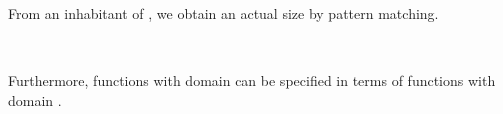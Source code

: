 From an inhabitant of , we obtain an actual size by
pattern matching.
\begin{code}%
\>[0]\AgdaSpace{}%
\AgdaSymbol{:}\AgdaSpace{}%
\AgdaSpace{}%
\AgdaSymbol{\{}\AgdaSymbol{\}}\AgdaSpace{}%
\AgdaSpace{}%
\AgdaSpace{}%
\AgdaSpace{}%
\AgdaSpace{}%
\<%
\\
\>[0]\AgdaSpace{}%
\AgdaOperator{\AgdaInductiveConstructor{[}}\AgdaSpace{}%
\AgdaSpace{}%
\AgdaOperator{\AgdaInductiveConstructor{]}}\AgdaSpace{}%
\AgdaSymbol{=}\AgdaSpace{}%
\<%
\end{code}
Furthermore, functions with domain   can be specified in terms of functions with domain  .
\begin{code}%
\>[0]\AgdaSpace{}%
\AgdaSymbol{:}\AgdaSpace{}%
\AgdaSymbol{\{}\AgdaSpace{}%
\AgdaSymbol{:}\AgdaSpace{}%
\AgdaSpace{}%
\AgdaSpace{}%
\AgdaSymbol{\}}\AgdaSpace{}%
\AgdaSymbol{\{}\AgdaSpace{}%
\AgdaSymbol{:}\AgdaSpace{}%
\AgdaSymbol{\}}\AgdaSpace{}%
\AgdaSpace{}%
\AgdaSymbol{((}\AgdaSpace{}%
\AgdaSymbol{:}\AgdaSpace{}%
\AgdaSpace{}%
\AgdaSymbol{)}\AgdaSpace{}%
\AgdaSpace{}%
\AgdaSpace{}%
\AgdaSymbol{)}\<%
\\
\>[0][@{}l@{\AgdaIndent{0}}]%
\>[2]\AgdaSpace{}%
\AgdaSymbol{(}\AgdaSpace{}%
\AgdaSymbol{:}\AgdaSpace{}%
\AgdaSpace{}%
\AgdaSymbol{)}\AgdaSpace{}%
\AgdaSpace{}%
\AgdaSpace{}%
\AgdaSymbol{(}\AgdaSpace{}%
\AgdaSymbol{)}\<%
\\
\>[0]\AgdaSpace{}%
\AgdaSpace{}%
\AgdaOperator{\AgdaInductiveConstructor{[}}\AgdaSpace{}%
\AgdaSpace{}%
\AgdaOperator{\AgdaInductiveConstructor{]}}\AgdaSpace{}%
\AgdaSymbol{=}\AgdaSpace{}%
\AgdaSpace{}%
\<%
\end{code}


